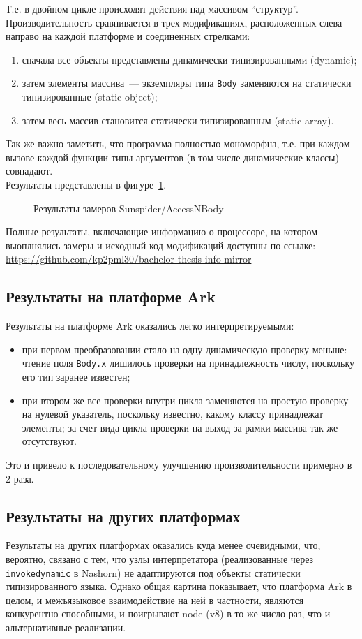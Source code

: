 \documentclass[times,specification,annotation]{itmo-student-thesis}
\begin{document}
Т.е. в двойном цикле происходят действия над массивом ``структур''. Производительность сравнивается в трех модификациях, расположенных слева направо на каждой платформе и соединенных стрелками:
\begin{enumerate}
	\item сначала все объекты представлены динамически типизированными (dynamic);
	\item затем элементы массива~--- экземпляры типа \texttt{Body} заменяются на статически типизированные (static object);
	\item затем весь массив становится статически типизированным (static array).
\end{enumerate}
Так же важно заметить, что программа полностью мономорфна, т.е. при каждом вызове каждой функции типы аргументов (в том числе динамические классы) совпадают.\\
Результаты представлены в фигуре~\ref{fig:accessnbodyres}.
\begin{figure}[!h]
	\caption{Результаты замеров Sunspider/AccessNBody}\label{fig:accessnbodyres}
	\resizebox{\textwidth}{!}{}
\end{figure}
Полные результаты, включающие информацию о процессоре, на котором выоплнялись замеры и исходный код модификаций доступны по ссылке: \url{https://github.com/kp2pml30/bachelor-thesis-info-mirror}

\subsection{Результаты на платформе Ark}
Результаты на платформе Ark оказались легко интерпретируемыми:
\begin{itemize}
\item при первом преобразовании стало на одну динамическую проверку меньше: чтение поля \texttt{Body.x} лишилось проверки на принадлежность числу, поскольку его тип заранее известен;
\item при втором же все проверки внутри цикла заменяются на простую проверку на нулевой указатель, поскольку известно, какому классу принадлежат элементы; за счет вида цикла проверки на выход за рамки массива так же отсутствуют.
\end{itemize}
Это и привело к последовательному улучшению производительности примерно в 2 раза.

\subsection{Результаты на других платформах}
Результаты на других платформах оказались куда менее очевидными, что, вероятно, связано с тем, что узлы интерпретатора (реализованные через \texttt{invokedynamic} в Nashorn) не адаптируются под объекты статически типизированного языка. Однако общая картина показывает, что платформа Ark в целом, и межъязыковое взаимодействие на ней в частности, являются конкурентно способными, и поигрывают node (v8) в то же число раз, что и альтернативные реализации.
\end{document}
